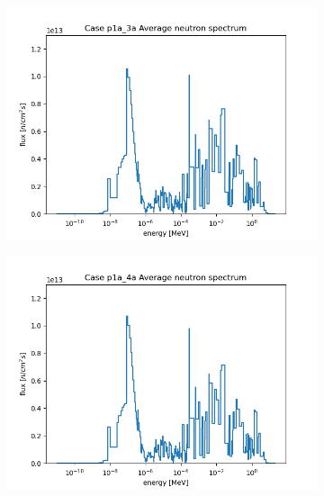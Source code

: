 \documentclass[letterpaper,11pt]{report}
\begin{document}
\begin{figure}[H]
\begin{subfigure}{.33\textwidth}
                \caption{}
              \end{subfigure}
              \begin{subfigure}{.33\textwidth}
                \centering
                \includegraphics[width=\linewidth]{../../phase1a/case3a/analysis_output/p1a_3a_f.png}
                \caption{}
              \end{subfigure}
              \begin{subfigure}{.33\textwidth}
                \centering
                \includegraphics[width=\linewidth]{../../phase1a/case4a/analysis_output/p1a_4a_f.png}
                \caption{}
              \end{subfigure}
              \begin{subfigure}{.32\textwidth}

\end{subfigure}
\end{figure}
\end{document}

